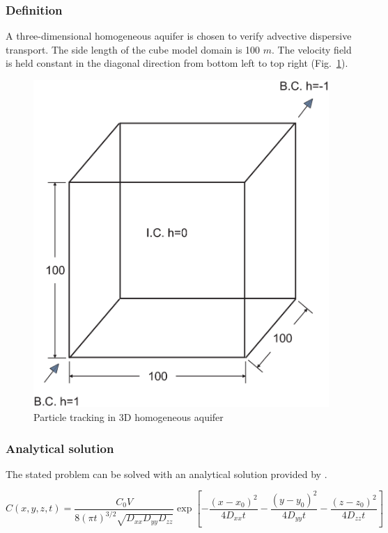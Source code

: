 \subsubsection{Definition}

A three-dimensional homogeneous aquifer is chosen to verify advective dispersive transport. The side length of the cube model domain is 100 $m$. The velocity field is held constant in the diagonal direction from bottom left to top right (Fig.~\ref{CubeSchematic}).

\begin{figure}[htbp!]
\centering
\includegraphics[scale=0.2]{PART_II/C/CubeSchematic.eps}
\caption{Particle tracking in 3D homogeneous aquifer}
\label{CubeSchematic}
\end{figure}

\subsubsection{Analytical solution}

The stated problem can be solved with an analytical solution provided by \cite{aO61}.

\begin{equation}\label{analytical3d}
C\left( {x,y,z,t} \right) = \frac{{C_0 V}}{{8\left(\pi t\right)^{3/2} \sqrt {D_{xx} D_{yy} D_{zz}} }}\exp\left[ { - \frac{{\left( {x - x_0 } \right)^2 }}{{4D_{xx} t}} - \frac{{\left( {y - y_0 } \right)^2 }}{{4D_{yy} t}} - \frac{{\left( {z - z_0 } \right)^2 }}{{4D_{zz} t}}} \right]
\end{equation}

